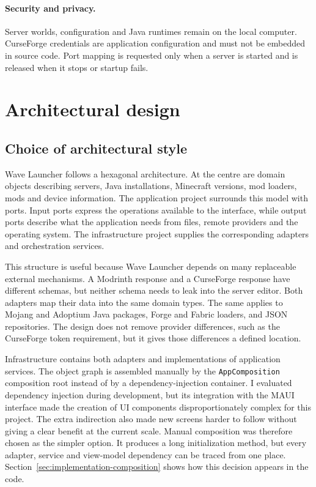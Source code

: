 \paragraph{Security and privacy.} Server worlds, configuration and Java runtimes remain on the local computer. CurseForge credentials are application configuration and must not be embedded in source code. Port mapping is requested only when a server is started and is released when it stops or startup fails.

\section{Architectural design}

\subsection{Choice of architectural style}

Wave Launcher follows a hexagonal architecture. At the centre are domain objects describing servers, Java installations, Minecraft versions, mod loaders, mods and device information. The application project surrounds this model with ports. Input ports express the operations available to the interface, while output ports describe what the application needs from files, remote providers and the operating system. The infrastructure project supplies the corresponding adapters and orchestration services.

This structure is useful because Wave Launcher depends on many replaceable external mechanisms. A Modrinth response and a CurseForge response have different schemas, but neither schema needs to leak into the server editor. Both adapters map their data into the same domain types. The same applies to Mojang and Adoptium Java packages, Forge and Fabric loaders, and JSON repositories. The design does not remove provider differences, such as the CurseForge token requirement, but it gives those differences a defined location.

Infrastructure contains both adapters and implementations of application services. The object graph is assembled manually by the \texttt{AppComposition} composition root instead of by a dependency-injection container. I evaluated dependency injection during development, but its integration with the MAUI interface made the creation of UI components disproportionately complex for this project. The extra indirection also made new screens harder to follow without giving a clear benefit at the current scale. Manual composition was therefore chosen as the simpler option. It produces a long initialization method, but every adapter, service and view-model dependency can be traced from one place. Section~\ref{sec:implementation-composition} shows how this decision appears in the code.

